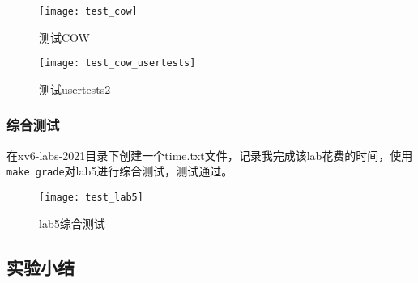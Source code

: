 \begin{figure}[!htb]
	\centering
	\texttt{[image: test\_cow]}
	\caption{测试COW}
	\label{fig:test_cow}
\end{figure}

\begin{figure}[!htb]
	\centering
	\texttt{[image: test\_cow\_usertests]}
	\caption{测试usertests2}
	\label{fig:test_cow_usertests}
\end{figure}

\subsubsection{综合测试}

在xv6-labs-2021目录下创建一个time.txt文件，记录我完成该lab花费的时间，使用\texttt{make grade}对lab5进行综合测试，测试通过。

\begin{figure}[!htb]
	\centering
	\texttt{[image: test\_lab5]}
	\caption{lab5综合测试}
	\label{fig:test_lab5}
\end{figure}

\subsection{实验小结}